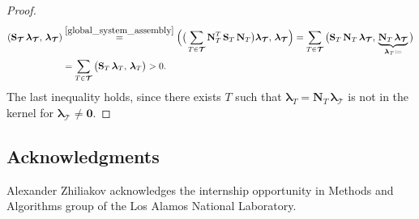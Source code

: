 \documentclass[12pt]{article}
\newcommand{\vect}[1]{\boldsymbol{\mathbf{#1}}}
\newcommand{\bcell}{T}
\newcommand{\bmesh}{{\vect{\mathcal T}}}
\begin{document}
\begin{proof}
\begin{align*}
		\left(\vect S_\bmesh\,\vect\lambda_\bmesh,\,\vect\lambda_\bmesh\right) &\stackrel{\eqref{global_system_assembly}}{=}
		\Big( \big( \sum_{\bcell \in \bmesh} \vect N^T_\bcell\,\vect S_\bcell\,\vect N_\bcell \big){\vect\lambda_\bmesh},\,{\vect\lambda_\bmesh} \Big) =
		\sum_{\bcell \in \bmesh} \big( \vect S_\bcell\,\vect N_\bcell\,{\vect\lambda_\bmesh},\,\underbrace{\vect N_\bcell\,{\vect\lambda_\bmesh}}_{{\vect \lambda_\bcell} \coloneqq} \big) \\
		& = \sum_{\bcell \in \bmesh} \big(\vect S_\bcell\,{\vect \lambda_\bcell},\,{\vect \lambda_\bcell} \big) > 0.
	\end{align*}
	The last inequality holds, since there exists $\bcell$ such that $\vect \lambda_\bcell=\vect N_\bcell\,{\vect\lambda_\bmesh}$ is not in the kernel for $\vect\lambda_\bmesh\neq\vect0$.
\end{proof}



\subsection*{Acknowledgments} Alexander Zhiliakov acknowledges the internship opportunity in Methods and Algorithms group of the Los Alamos National Laboratory.



		
\end{document}
